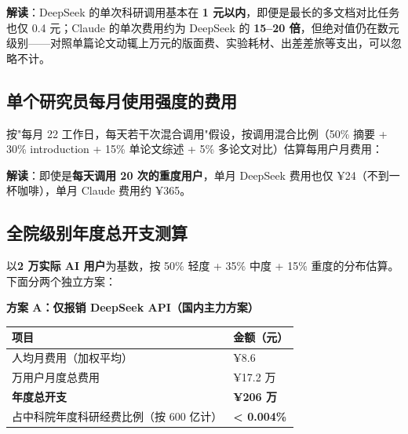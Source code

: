 \textbf{解读}：DeepSeek 的单次科研调用基本在 \textbf{1 元以内}，即便是最长的多文档对比任务也仅 0.4 元；Claude 的单次费用约为 DeepSeek 的 \textbf{15--20 倍}，但绝对值仍在数元级别——对照单篇论文动辄上万元的版面费、实验耗材、出差差旅等支出，可以忽略不计。

\subsection{单个研究员每月使用强度的费用}

按"每月 22 工作日，每天若干次混合调用"假设，按调用混合比例（50\% 摘要 + 30\% introduction + 15\% 单论文综述 + 5\% 多论文对比）估算每用户月费用：

\begin{table}[h]
\centering
\renewcommand{\arraystretch}{1.3}
\end{table}

\textbf{解读}：即使是\textbf{每天调用 20 次的重度用户}，单月 DeepSeek 费用也仅 ¥24（不到一杯咖啡），单月 Claude 费用约 ¥365。

\subsection{全院级别年度总开支测算}

以\textbf{2 万实际 AI 用户}为基数，按 50\% 轻度 + 35\% 中度 + 15\% 重度的分布估算。下面分两个独立方案：

\medskip
\textbf{方案 A：仅报销 DeepSeek API（国内主力方案）}

\begin{table}[h]
\centering
\renewcommand{\arraystretch}{1.3}
\begin{tabularx}{\textwidth}{@{}>{\raggedright\arraybackslash}X >{\raggedleft\arraybackslash}p{4.5cm}@{}}
\toprule
\rowcolor{primary!15}
\textbf{项目} & \textbf{金额（元）} \\
\midrule
人均月费用（加权平均） & ¥8.6 \\
2 万用户月度总费用 & ¥17.2 万 \\
\rowcolor{primary!8}
\textbf{年度总开支} & \textbf{¥206 万} \\
占中科院年度科研经费比例（按 600 亿计）& \textbf{< 0.004\%} \\
\bottomrule
\end{tabularx}
\end{table}

